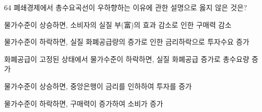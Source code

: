 \begin{question}{64}
폐쇄경제에서 총수요곡선이 우하향하는 이유에 관한 설명으로 옳지 않은 것은?
\begin{choices}
  \item 물가수준이 상승하면, 소비자의 실질 부(富)의 효과 감소로 인한 구매력 감소
  \item 물가수준이 하락하면, 실질 화폐공급량의 증가로 인한 금리하락으로 투자수요 증가
  \item 화폐공급이 고정된 상태에서 물가수준이 하락하면, 실질 화폐공급 증가로 총수요량 증가
  \item 물가수준이 상승하면, 중앙은행이 금리를 인하하여 투자를 증가
  \item 물가수준이 하락하면, 구매력이 증가하여 소비가 증가
\end{choices}
\end{question}
